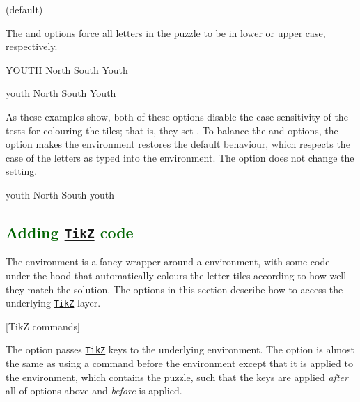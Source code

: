 \documentclass[svgnames]{report}
\newcommand\ctan[1]{\href{https://www.ctan.org/pkg/#1}{\texttt{#1}}}
\newcommand\Section[1]{\subsection{\textcolor{DarkGreen}{#1}}}
\begin{document}
   (default) \qquad
   \qquad

  The  and  options force all
  letters in the puzzle to be in lower or upper case, respectively.

  \begin{example}
    \begin{wordle}{YOUTH}
      North
      South
      Youth
    \end{wordle}
  \end{example}

  \begin{example}
    \begin{wordle}{youth}
      North
      South
      Youth
    \end{wordle}
  \end{example}

  As these examples show, both of these options disable the case
  sensitivity of the tests for colouring the  tiles;
  that is, they set .  To balance the
   and  options, the
   option makes the  environment
  restores the default behaviour, which respects the case of the letters
  as typed into the environment. The  option does
  not change the  setting.

  \begin{example}
    \begin{wordle}{youth} %
      North
      South
      youth
    \end{wordle}
  \end{example}

  \Section{Adding \ctan{TikZ} code}

  The  environment is a fancy wrapper around a
   environment, with some code under the hood that
  automatically colours the letter tiles according to how well they
  match the solution. The options in this section describe how to access
  the underlying \ctan{TikZ} layer.

  [TikZ commands]

  The  option passes \ctan{TikZ} keys to the underlying
   environment. The  option is almost
  the same as using a \keyword{\tikzset{...}} command before the
   environment except that it is applied to the
   environment, which contains the 
  puzzle, such that the  keys are applied \textit{after}
  all of options above and \textit{before}  is
  applied.
\end{document}
